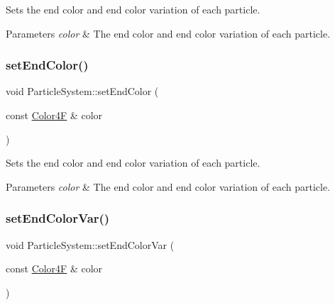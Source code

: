 Sets the end color and end color variation of each particle.


\begin{DoxyParams}{Parameters}
{\em color} & The end color and end color variation of each particle. \\
\hline
\end{DoxyParams}
\mbox{\label{classParticleSystem_a09c4f2ca4f9386d00a4e852de96bfa9c}} 
\subsubsection{\texorpdfstring{set\+End\+Color()}{setEndColor()}\hspace{0.1cm}{\footnotesize\ttfamily [2/2]}}
{\footnotesize\ttfamily void Particle\+System\+::set\+End\+Color (\begin{DoxyParamCaption}\item[{const \hyperlink{structColor4F}{Color4F} \&}]{color }\end{DoxyParamCaption})\hspace{0.3cm}{\ttfamily [inline]}}

Sets the end color and end color variation of each particle.


\begin{DoxyParams}{Parameters}
{\em color} & The end color and end color variation of each particle. \\
\hline
\end{DoxyParams}
\mbox{\label{classParticleSystem_a97c0354219c2fdc0451a99ce25484b3d}} 
\subsubsection{\texorpdfstring{set\+End\+Color\+Var()}{setEndColorVar()}\hspace{0.1cm}{\footnotesize\ttfamily [1/2]}}
{\footnotesize\ttfamily void Particle\+System\+::set\+End\+Color\+Var (\begin{DoxyParamCaption}\item[{const \hyperlink{structColor4F}{Color4F} \&}]{color }\end{DoxyParamCaption})\hspace{0.3cm}{\ttfamily [inline]}}

